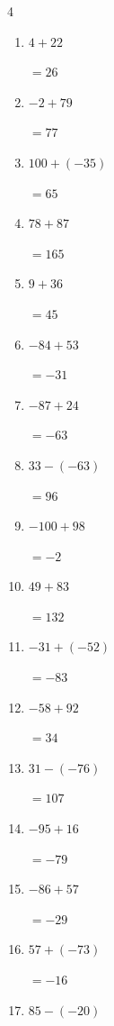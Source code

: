 \begin{multicols}{4}
\begin{enumerate}
        $=-145$

  \item $4+22$

        $=26$

  \item $-2+79$

        $=77$

  \item $100+(-35)$

        $=65$

\columnbreak %

  \item $78+87$

        $=165$

  \item $9+36$

        $=45$

  \item $-84+53$

        $=-31$

  \item $-87+24$

        $=-63$

  \item $33-(-63)$

        $=96$

  \item $-100+98$

        $=-2$

  \item $49+83$

        $=132$

  \item $-31+(-52)$

        $=-83$

  \item $-58+92$

        $=34$

  \item $31-(-76)$

        $=107$

  \item $-95+16$

        $=-79$

  \item $-86+57$

        $=-29$

  \item $57+(-73)$

        $=-16$

  \item $85-(-20)$


\end{enumerate}
\end{multicols}
